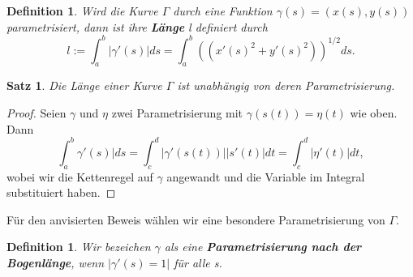 \documentclass[12pt,a4paper]{article}
\theoremstyle{plain}
\newtheorem{Satz}[Theorem]{Satz}
\newtheorem{Definition}[Theorem]{Definition}
\newcommand{\herv}[1]{{\emph{\textbf{#1}}}}
\numberwithin{equation}{section}
\begin{document}
\begin{Definition}
Wird die Kurve $\Gamma$ durch eine Funktion $\gamma(s)=(x(s),y(s))$ parametrisiert, dann ist ihre \herv{Länge} l definiert durch \[
l:=\int_a^b{|\gamma'(s)|ds}=\int_a^b {\left((x'(s)^2+y'(s)^2)\right)^{1/2}ds}.\]
\end{Definition}
\begin{Satz}
Die Länge einer Kurve $\Gamma$ ist unabhängig von deren Parametrisierung.
\end{Satz}
\begin{proof}
Seien $\gamma$ und $\eta$ zwei Parametrisierung mit $\gamma(s(t))=\eta(t)$ wie oben. Dann \[ \int_a^b{\gamma'(s)|ds} = \int_c^d{|\gamma'(s(t))||s'(t)|dt} = \int_c^d{|\eta'(t)|dt} ,\] wobei wir die Kettenregel auf $\gamma$ angewandt und die Variable im Integral substituiert haben.
\end{proof}
Für den anvisierten Beweis wählen wir eine besondere Parametrisierung von $\Gamma$.
\begin{Definition}
Wir bezeichen $\gamma$ als eine \herv{Parametrisierung nach der Bogenlänge}, wenn $|\gamma'(s)=1|$ für alle s.
\end{Definition}
\end{document}
